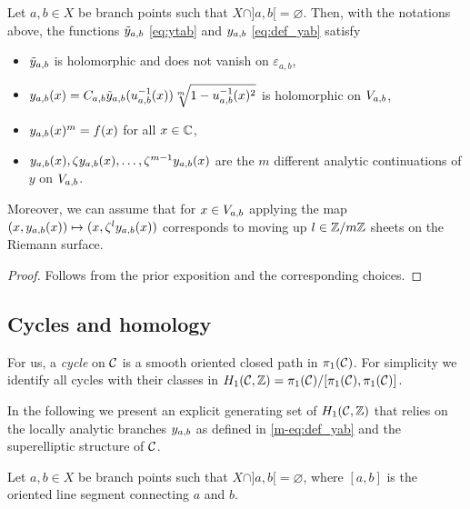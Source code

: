 \documentclass[main.tex]{subfiles}
\begin{document}
  
 \begin{prop}\label{prop:yab}
      Let $a,b\in X$ be branch points such that $X\cap]a,b[=\varnothing$.
      Then, with the notations above, the functions
      $\tilde{y}_{a,b}$ \eqref{eq:ytab} and $y_{a,b}$ \eqref{eq:def_yab}
      satisfy
     \begin{itemize}
         \item $\tilde{y}_{a,b}$ is holomorphic and does not vanish on $ε_{a,b}$,
         \item $y_{a,b}(x) = C_{a,b} \tilde{y}_{a,b}(u_{a,b}^{-1}(x)) \sqrt[m]{1-u_{a,b}^{-1}(x)^2}$ is holomorphic
         on $V_{a,b}$,
         \item $y_{a,b}(x)^m = f(x)$ for all $x\in\mathbb{C}$,
         \item $y_{a,b}(x),\zeta y_{a,b}(x),\dots,\zeta^{m-1}y_{a,b}(x)$ are the $m$ different analytic continuations of $y$ on $V_{a,b}$.
     \end{itemize}
     Moreover, we can assume that for $x \in V_{a,b}$ applying the map $(x,y_{a,b}(x)) \mapsto (x,\zeta^ly_{a,b}(x))$ corresponds to moving up $l \in \mathbb{Z}/m\mathbb{Z}$ sheets on the Riemann surface.
 \end{prop}
 \begin{proof}
  Follows from the prior exposition and the corresponding choices. 
 \end{proof}

 
 


 \subsection{Cycles and homology}\label{subsec:cycles_homo}
   
   For us, a \emph{cycle} on $\mathcal{C}$ is a smooth oriented closed path in $\pi_1(\mathcal{C})$.
   For simplicity we identify all cycles with their classes in $H_1(\mathcal{C},\mathbb{Z}) = \pi_1(\mathcal{C})/[\pi_1(\mathcal{C}),\pi_1(\mathcal{C})]$. 
   
   In the following we present an 
   explicit generating set of $H_1(\mathcal{C},\mathbb{Z})$ that relies on the locally analytic branches $y_{a,b}$ as defined in \eqref{m-eq:def_yab} and the superelliptic structure of $\mathcal{C}$.

   Let $a, b \in X$ be branch points such that $X\cap]a,b[=\varnothing$, where  $[a,b]$ is the oriented line segment connecting $a$ and $b$. 
   
\end{document}
